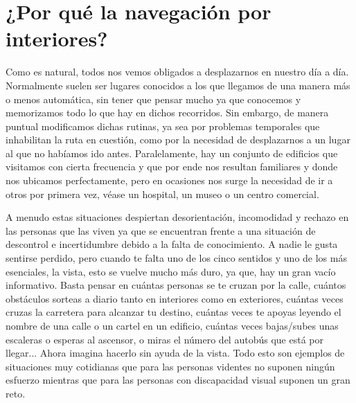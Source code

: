 



\section{¿Por qué la navegación por interiores?}


Como es natural, todos nos vemos obligados a desplazarnos en nuestro día a día. Normalmente suelen ser lugares conocidos a los que llegamos de una manera más o menos automática, sin tener que pensar mucho ya que conocemos y memorizamos todo lo que hay en dichos recorridos. Sin embargo, de manera puntual modificamos dichas rutinas, ya sea por problemas temporales que inhabilitan la ruta en cuestión, como por la necesidad de desplazarnos a un lugar al que no habíamos ido antes. Paralelamente, hay un conjunto de edificios que visitamos con cierta frecuencia y que por ende nos resultan familiares y donde nos ubicamos perfectamente, pero en ocasiones nos surge la necesidad de ir a otros por primera vez, véase un hospital, un museo o un centro comercial. 

A menudo estas situaciones despiertan desorientación, incomodidad y rechazo en las personas que las viven ya que se encuentran frente a una situación de descontrol e incertidumbre debido a la falta de conocimiento. A nadie le gusta sentirse perdido, pero cuando te falta uno de los cinco sentidos y uno de los más esenciales, la vista, esto se vuelve mucho más duro, ya que, hay un gran vacío informativo. Basta pensar en cuántas personas se te cruzan por la calle, cuántos obstáculos sorteas a diario tanto en interiores como en exteriores, cuántas veces cruzas la carretera para alcanzar tu destino, cuántas veces te apoyas leyendo el nombre de una calle o un cartel en un edificio, cuántas veces bajas/subes unas escaleras o esperas al ascensor, o miras el número del autobús que está por llegar... Ahora imagina hacerlo sin ayuda de la vista. Todo esto son ejemplos de situaciones muy cotidianas que para las personas videntes no suponen ningún esfuerzo mientras que para las personas con discapacidad visual suponen un gran reto. 

